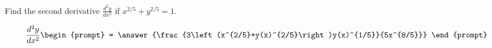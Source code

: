 \documentclass{ximera}
\author{Gregory Hartman \and Matthew Carr}
\begin{document}
\begin{exercise}





Find the second derivative $\frac{d^2y}{dx^2}$ if $x^{2/5}+y^{2/5}=1$.

\[
\frac{d^2y}{dx^2}
\begin{prompt}
= \answer{\frac{3\left(x^{2/5}+y(x)^{2/5}\right)y(x)^{1/5}}{5x^{8/5}}}
\end{prompt}
\]

\end{exercise}
\end{document}
